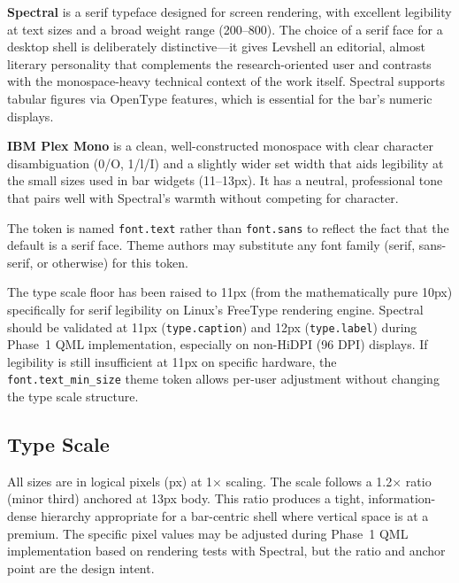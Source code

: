 \documentclass[11pt,a4paper]{article}
\begin{document}
\textbf{Spectral} is a serif typeface designed for screen rendering, with excellent legibility at text sizes and a broad weight range (200--800). The choice of a serif face for a desktop shell is deliberately distinctive---it gives Levshell an editorial, almost literary personality that complements the research-oriented user and contrasts with the monospace-heavy technical context of the work itself. Spectral supports tabular figures via OpenType features, which is essential for the bar's numeric displays.

\textbf{IBM Plex Mono} is a clean, well-constructed monospace with clear character disambiguation (0/O, 1/l/I) and a slightly wider set width that aids legibility at the small sizes used in bar widgets (11--13px). It has a neutral, professional tone that pairs well with Spectral's warmth without competing for character.

The token is named \texttt{font.text} rather than \texttt{font.sans} to reflect the fact that the default is a serif face. Theme authors may substitute any font family (serif, sans-serif, or otherwise) for this token.

\begin{notebox}
The type scale floor has been raised to 11px (from the mathematically pure 10px) specifically for serif legibility on Linux's FreeType rendering engine. Spectral should be validated at 11px (\texttt{type.caption}) and 12px (\texttt{type.label}) during Phase~1 QML implementation, especially on non-HiDPI (96 DPI) displays. If legibility is still insufficient at 11px on specific hardware, the \texttt{font.text\_min\_size} theme token allows per-user adjustment without changing the type scale structure.
\end{notebox}

\subsection{Type Scale}

All sizes are in logical pixels (px) at 1$\times$ scaling. The scale follows a 1.2$\times$ ratio (minor third) anchored at 13px body. This ratio produces a tight, information-dense hierarchy appropriate for a bar-centric shell where vertical space is at a premium. The specific pixel values may be adjusted during Phase~1 QML implementation based on rendering tests with Spectral, but the ratio and anchor point are the design intent.
\end{document}
